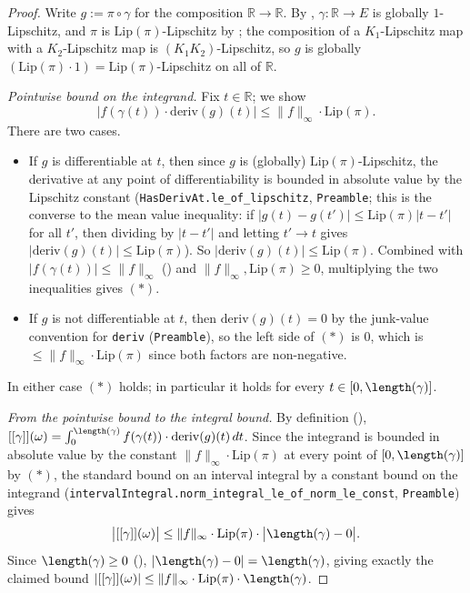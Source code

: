 \begin{proof}
  Write $g := \pi \circ \gamma$ for the composition $\mathbb{R} \to \mathbb{R}$. By
  , $\gamma \colon \mathbb{R} \to E$ is globally $1$-Lipschitz, and $\pi$ is
  $\mathrm{Lip}(\pi)$-Lipschitz by ; the composition of a $K_1$-Lipschitz map with a
  $K_2$-Lipschitz map is $(K_1 K_2)$-Lipschitz, so $g$ is globally
  $(\mathrm{Lip}(\pi) \cdot 1) = \mathrm{Lip}(\pi)$-Lipschitz on all of $\mathbb{R}$.

  \emph{Pointwise bound on the integrand.} Fix $t \in \mathbb{R}$; we show
  \[
    \bigl|f(\gamma(t)) \cdot \mathrm{deriv}(g)(t)\bigr| \le \|f\|_\infty \cdot \mathrm{Lip}(\pi)
    . \tag{$\ast$}
  \]
  There are two cases.
  \begin{itemize}
    \item If $g$ is differentiable at $t$, then since $g$ is (globally) $\mathrm{Lip}(\pi)$-Lipschitz,
      the derivative at any point of differentiability is bounded in absolute value by the
      Lipschitz constant (\texttt{HasDerivAt.le\_of\_lipschitz}, \texttt{Preamble}; this is the
      converse to the mean value inequality: if $|g(t)-g(t')|\le\mathrm{Lip}(\pi)|t-t'|$ for all
      $t'$, then dividing by $|t-t'|$ and letting $t'\to t$ gives $|\mathrm{deriv}(g)(t)|\le\mathrm{Lip}(\pi)$).
      So $|\mathrm{deriv}(g)(t)| \le \mathrm{Lip}(\pi)$. Combined with $|f(\gamma(t))| \le \|f\|_\infty$
      () and $\|f\|_\infty, \mathrm{Lip}(\pi) \ge 0$, multiplying the two
      inequalities gives $(\ast)$.
    \item If $g$ is not differentiable at $t$, then $\mathrm{deriv}(g)(t) = 0$ by the junk-value convention
      for \texttt{deriv} (\texttt{Preamble}), so the left side of $(\ast)$ is $0$, which is
      $\le \|f\|_\infty \cdot \mathrm{Lip}(\pi)$ since both factors are non-negative.
  \end{itemize}
  In either case $(\ast)$ holds; in particular it holds for every $t \in [0,\length(\gamma)]$.

  \emph{From the pointwise bound to the integral bound.} By definition (),
  $[[\gamma]](\omega) = \int_0^{\length(\gamma)} f(\gamma(t)) \cdot \mathrm{deriv}(g)(t)\,dt$. Since the
  integrand is bounded in absolute value by the constant $\|f\|_\infty \cdot \mathrm{Lip}(\pi)$ at
  every point of $[0,\length(\gamma)]$ by $(\ast)$, the standard bound on an interval integral by a
  constant bound on the integrand (\texttt{intervalIntegral.norm\_integral\_le\_of\_norm\_le\_const},
  \texttt{Preamble}) gives
  \[
    \bigl|[[\gamma]](\omega)\bigr| \le \|f\|_\infty \cdot \mathrm{Lip}(\pi) \cdot \bigl|\length(\gamma) - 0\bigr|
    .
  \]
  Since $\length(\gamma) \ge 0$ (), $|\length(\gamma) - 0| = \length(\gamma)$, giving
  exactly the claimed bound
  $|[[\gamma]](\omega)| \le \|f\|_\infty \cdot \mathrm{Lip}(\pi) \cdot \length(\gamma)$.
\end{proof}
